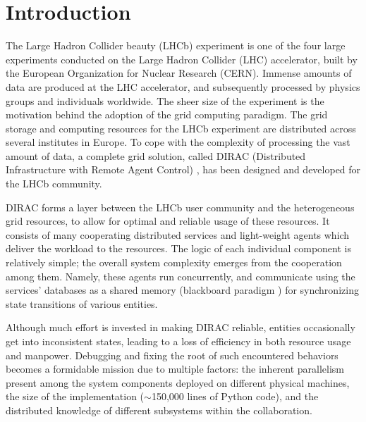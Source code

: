 \documentclass[10pt,conference]{IEEEtran}
\begin{document}
\section{Introduction}

The Large Hadron Collider beauty (LHCb) experiment \cite{LHCb} is one of the
four large
experiments conducted on the Large Hadron Collider (LHC) accelerator, built by
the European Organization for Nuclear Research (CERN). Immense amounts of data
are produced at the LHC accelerator, and subsequently processed by physics
groups and individuals worldwide. The sheer size of the experiment is the
motivation behind the adoption of the grid computing paradigm. The grid storage
and computing resources for the LHCb experiment are distributed across several
institutes in Europe. To cope with the complexity of processing the vast amount
of data, a complete grid solution, called DIRAC (Distributed Infrastructure with
Remote Agent Control) \cite{DIRAC_CommGridSolution,DIRAC_ReliableDataMaangement}, 
has been designed and developed for the
LHCb
community.

DIRAC forms a layer between the LHCb user community and the heterogeneous
grid resources, to allow for optimal and reliable usage of these
resources. It consists of many cooperating distributed services and light-weight
agents which deliver the workload to the resources. The logic of each individual
component is relatively simple; the overall system complexity emerges from the
cooperation among them. Namely, these agents run concurrently, and communicate
using the services' databases as a shared memory (blackboard paradigm \cite{IEEEexample:blackboard_systems}) for
synchronizing state transitions of various entities.

Although much effort is invested in making DIRAC reliable, entities occasionally
get into inconsistent states, leading to a loss of efficiency in both
resource usage and manpower. Debugging and fixing the root of such encountered
behaviors becomes a formidable mission due to multiple factors: the inherent
parallelism present among the system components deployed on different physical
machines, the size of the implementation ($\sim$150,000 lines of Python code),
and the distributed knowledge of different subsystems within the collaboration.
\end{document}
